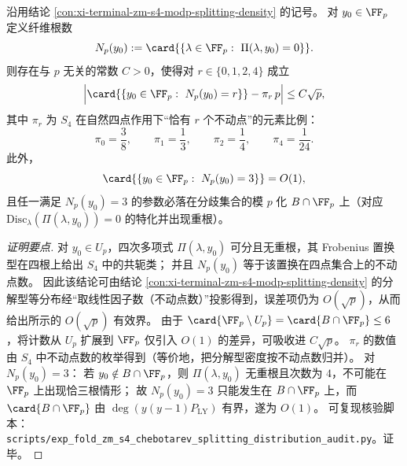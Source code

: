 \begin{conclusion}\label{con:xi-terminal-zm-s4-modp-fiber-rootcount-fixedpoints}
沿用结论 \ref{con:xi-terminal-zm-s4-modp-splitting-density} 的记号。
对 \(y_0\in\FF_p\) 定义纤维根数
\[
N_p(y_0):=\card{\{\lambda\in\FF_p:\ \Pi(\lambda,y_0)=0\}}.
\]
则存在与 \(p\) 无关的常数 \(C>0\)，使得对 \(r\in\{0,1,2,4\}\) 成立
\[
\Bigl|\card{\{y_0\in\FF_p:\ N_p(y_0)=r\}}-\pi_r\,p\Bigr|\le C\sqrt p,
\]
其中 \(\pi_r\) 为 \(S_4\) 在自然四点作用下“恰有 \(r\) 个不动点”的元素比例：
\[
\pi_0=\frac{3}{8},\qquad
\pi_1=\frac{1}{3},\qquad
\pi_2=\frac{1}{4},\qquad
\pi_4=\frac{1}{24}.
\]
此外，
\[
\card{\{y_0\in\FF_p:\ N_p(y_0)=3\}}=O(1),
\]
且任一满足 \(N_p(y_0)=3\) 的参数必落在分歧集合的模 \(p\) 化 \(B\cap\FF_p\) 上（对应 \(\mathrm{Disc}_\lambda(\Pi(\lambda,y_0))=0\) 的特化并出现重根）。
\end{conclusion}
\begin{proof}[证明要点]
对 \(y_0\in U_p\)，四次多项式 \(\Pi(\lambda,y_0)\) 可分且无重根，其 Frobenius 置换型在四根上给出 \(S_4\) 中的共轭类；
并且 \(N_p(y_0)\) 等于该置换在四点集合上的不动点数。
因此该结论可由结论 \ref{con:xi-terminal-zm-s4-modp-splitting-density} 的分解型等分布经“取线性因子数（不动点数）”投影得到，误差项仍为 \(O(\sqrt p)\)，从而给出所示的 \(O(\sqrt p)\) 有效界。
由于 \(\card{\FF_p\setminus U_p}=\card{B\cap\FF_p}\le 6\)，将计数从 \(U_p\) 扩展到 \(\FF_p\) 仅引入 \(O(1)\) 的差异，可吸收进 \(C\sqrt p\)。
\(\pi_r\) 的数值由 \(S_4\) 中不动点数的枚举得到（等价地，把分解型密度按不动点数归并）。
对 \(N_p(y_0)=3\)：
若 \(y_0\notin B\cap\FF_p\)，则 \(\Pi(\lambda,y_0)\) 无重根且次数为 \(4\)，不可能在 \(\FF_p\) 上出现恰三根情形；
故 \(N_p(y_0)=3\) 只能发生在 \(B\cap\FF_p\) 上，而 \(\card{B\cap\FF_p}\) 由 \(\deg(y(y-1)P_{\mathrm{LY}})\) 有界，遂为 \(O(1)\)。
可复现核验脚本：\texttt{scripts/exp\_fold\_zm\_s4\_chebotarev\_splitting\_distribution\_audit.py}。证毕。
\end{proof}

